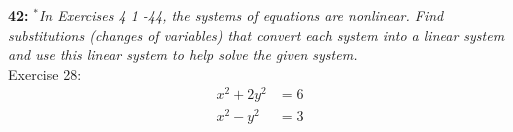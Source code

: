 \documentclass[12pt,letterpaper]{hmcpset}
\begin{document}
\vspace{180pt}
\pagebreak

\begin{problem}
\textbf{42:}  \textit{$^*$In Exercises 4 1 -44, the systems of equations are nonlinear.
Find substitutions (changes of variables) that convert each
system into a linear system and use this linear system to help
solve the given system.}\\
Exercise 28:
\begin{equation}
\begin{split}
x^2 + 2y^2 &= 6 \\
x^2 - y^2 &= 3
\end{split}
\end{equation}

\end{problem}
\end{document}
